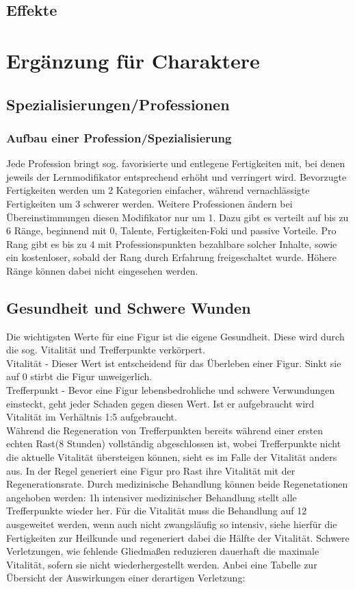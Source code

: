 \documentclass[a4paper,12pt,oneside]{book}
\begin{document}
\chapter{Effekte}

\part{Ergänzung für Charaktere}
\setcounter{chapter}{0}
\chapter{Spezialisierungen/Professionen}
\section{Aufbau einer Profession/Spezialisierung}
Jede Profession bringt sog. favorisierte und entlegene Fertigkeiten mit, bei denen jeweils der Lernmodifikator entsprechend erhöht und verringert wird. Bevorzugte Fertigkeiten werden um 2 Kategorien einfacher, während vernachlässigte Fertigkeiten um 3 schwerer werden. Weitere Professionen ändern bei Übereinstimmungen diesen Modifikator nur um 1.
Dazu gibt es verteilt auf bis zu 6 Ränge, beginnend mit 0, Talente, Fertigkeiten-Foki und passive Vorteile.
Pro Rang gibt es bis zu 4 mit Professionspunkten bezahlbare solcher Inhalte, sowie ein kostenloser, sobald der Rang durch Erfahrung freigeschaltet wurde. Höhere Ränge können dabei nicht eingesehen werden.  


\chapter{Gesundheit und Schwere Wunden}
Die wichtigsten Werte für eine Figur ist die eigene Gesundheit. Diese wird durch die sog. Vitalität und Trefferpunkte verkörpert.
\\Vitalität - Dieser Wert ist entscheidend für das Überleben einer Figur. Sinkt sie auf 0 stirbt die Figur unweigerlich.
\\Trefferpunkt - Bevor eine Figur lebensbedrohliche und schwere Verwundungen einsteckt, geht jeder Schaden gegen diesen Wert. Ist er aufgebraucht wird Vitalität im Verhältnis 1:5 aufgebraucht.
\\Während die Regeneration von Trefferpunkten bereits während einer ersten echten Rast(8 Stunden) vollständig abgeschlossen ist, wobei Trefferpunkte nicht die aktuelle Vitalität übersteigen können, sieht es im Falle der Vitalität anders aus. In der Regel generiert eine Figur pro Rast ihre Vitalität mit der Regenerationsrate. Durch medizinische Behandlung können beide Regenetationen angehoben werden: 1h intensiver medizinischer Behandlung stellt alle Trefferpunkte wieder her. Für die Vitalität muss die Behandlung auf 12 ausgeweitet werden, wenn auch nicht zwangsläufig so intensiv, siehe hierfür die Fertigkeiten zur Heilkunde und regeneriert dabei die Hälfte der Vitalität.
Schwere Verletzungen, wie fehlende Gliedmaßen reduzieren dauerhaft die maximale Vitalität, sofern sie nicht wiederhergestellt werden. Anbei eine Tabelle zur Übersicht der Auswirkungen einer derartigen Verletzung:
\end{document}
